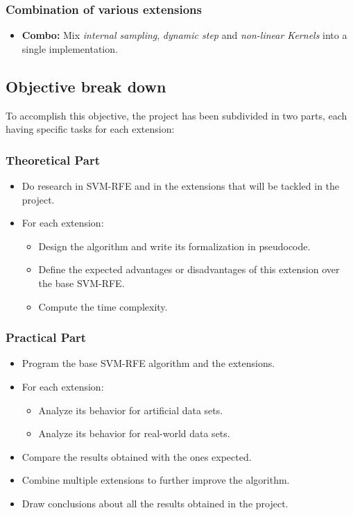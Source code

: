 \subsubsection*{Combination of various extensions}

\begin{itemize}
    \item \textbf{Combo:} Mix \emph{internal sampling}, \emph{dynamic step} and \emph{non-linear Kernels} into a single implementation.
\end{itemize}

\subsection{Objective break down}

To accomplish this objective, the project has been sub\-divided in two parts, each having specific tasks for each extension:

\subsubsection*{Theoretical Part}

\begin{itemize}
    \item Do research in SVM-RFE and in the extensions that will be tackled in the project.
    \item {
        For each extension:
        \begin{itemize}
            \item Design the algorithm and write its formalization in pseudocode.
            \item Define the expected advantages or disadvantages of this extension over the base SVM-RFE.
            \item Compute the time complexity.
        \end{itemize}
    }
\end{itemize}

\subsubsection*{Practical Part}

\begin{itemize}
    \item Program the base SVM-RFE algorithm and the extensions.
    \item {
        For each extension:
        \begin{itemize}
            \item Analyze its behavior for artificial data sets.
            \item Analyze its behavior for real-world data sets.
        \end{itemize}
    }
    \item Compare the results obtained with the ones expected.
    \item Combine multiple extensions to further improve the algorithm.
    \item Draw conclusions about all the results obtained in the project.
\end{itemize}

